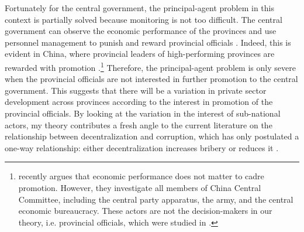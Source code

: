 \documentclass[12pt]{article}
\begin{document}
Fortunately for the central government, the principal-agent problem in this context is partially solved because monitoring is not too difficult. The central government can observe the economic performance of the provinces and use personnel management to punish and reward provincial officials \citep{Sheng2007}. Indeed, this is evident in China, where provincial leaders of high-performing provinces are rewarded with promotion \citep{Li2005}.\footnote{\citet{Shih2012} recently argues that economic performance does not matter to cadre promotion. However, they investigate all members of China Central Committee, including the central party apparatus, the army, and the central economic bureaucracy. These actors are not the decision-makers in our theory, i.e. provincial officials, which were studied in \citep{Li2005}.} Therefore, the principal-agent problem is only severe when the provincial officials are not interested in further promotion to the central government. This suggests that there will be a variation in private sector development across provinces according to the interest in promotion of the provincial officials. By looking at the variation in the interest of sub-national actors, my theory contributes a fresh angle to the current literature on the relationship between decentralization and corruption, which has only postulated a one-way relationship: either decentralization increases bribery \citep{Fan2009} or reduces it \citep{Guerra2009}.
\end{document}
